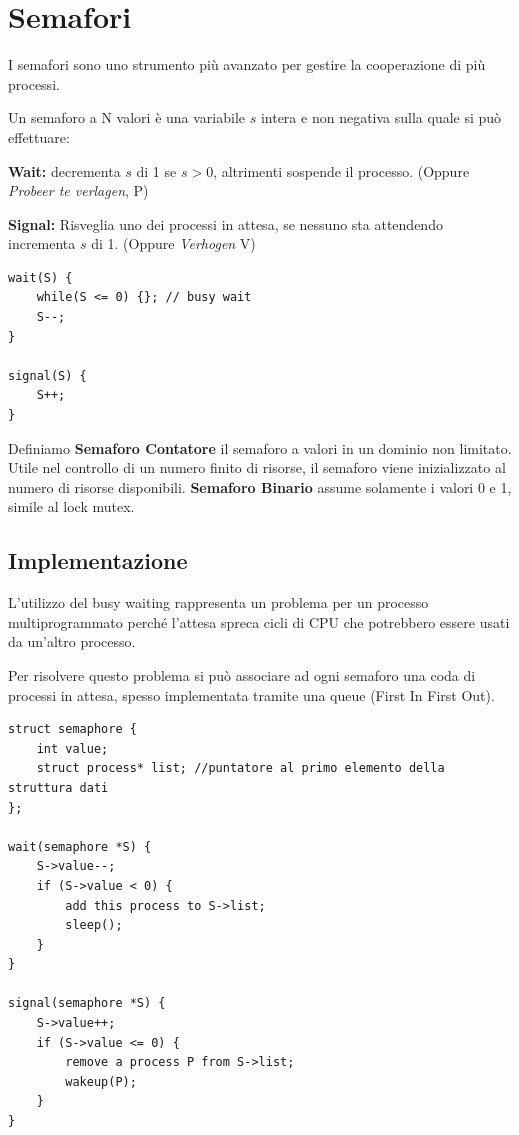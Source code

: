 \section{Semafori}
I semafori sono uno strumento più avanzato per gestire la cooperazione di più processi.

\spacer
Un semaforo a N valori è una variabile $s$ intera e non negativa sulla quale si può effettuare:
\begin{sitemize}
    \item \textbf{Wait:} decrementa $s$ di 1 se $s>0$, altrimenti sospende il processo. (Oppure \textit{Probeer te verlagen}, P)
    \item \textbf{Signal:} Risveglia uno dei processi in attesa, se nessuno sta attendendo incrementa $s$ di 1. (Oppure \textit{Verhogen} V)
\end{sitemize}

\begin{verbatim}
wait(S) {
    while(S <= 0) {}; // busy wait
    S--;
}

signal(S) {
    S++;
}
\end{verbatim}


Definiamo \textbf{Semaforo Contatore} il semaforo a valori in un dominio non limitato. Utile nel controllo di un numero finito di risorse, il semaforo viene inizializzato al numero di risorse disponibili.
\textbf{Semaforo Binario} assume solamente i valori 0 e 1, simile al lock mutex.

\subsection{Implementazione}
L'utilizzo del busy waiting rappresenta un problema per un processo multiprogrammato perché l'attesa spreca cicli di CPU che potrebbero essere usati da un'altro processo.

\spacer
Per risolvere questo problema si può associare ad ogni semaforo una coda di processi in attesa, spesso implementata tramite una queue (First In First Out).


\begin{verbatim}
struct semaphore {
    int value;
    struct process* list; //puntatore al primo elemento della struttura dati
};

wait(semaphore *S) { 
    S->value--;
    if (S->value < 0) {
        add this process to S->list;
        sleep();
    }
}

signal(semaphore *S) { 
    S->value++;
    if (S->value <= 0) {
        remove a process P from S->list; 
        wakeup(P);
    }
}
\end{verbatim}

